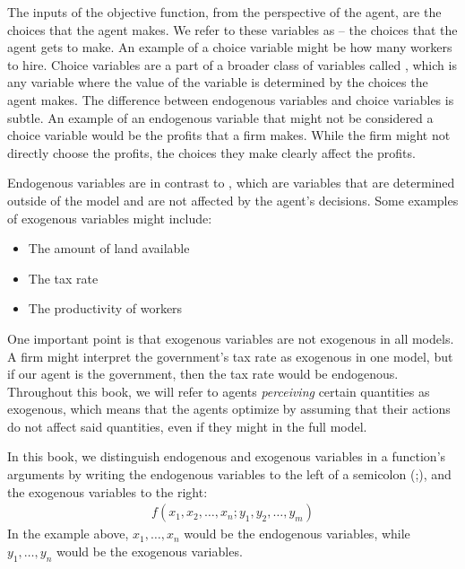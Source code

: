The inputs of the objective function, from the perspective of the agent, are the choices that the agent makes. We refer to these variables as  -- the choices that the agent gets to make. An example of a choice variable might be how many workers to hire. Choice variables are a part of a broader class of variables called , which is any variable where the value of the variable is determined by the choices the agent makes. The difference between endogenous variables and choice variables is subtle. An example of an endogenous variable that might not be considered a choice variable would be the profits that a firm makes. While the firm might not directly choose the profits, the choices they make clearly affect the profits.

Endogenous variables are in contrast to , which are variables that are determined outside of the model and are not affected by the agent's decisions. Some examples of exogenous variables might include:
\begin{itemize}
    \item The amount of land available
    \item The tax rate
    \item The productivity of workers
\end{itemize}
One important point is that exogenous variables are not exogenous in all models. A firm might interpret the government's tax rate as exogenous in one model, but if our agent is the government, then the tax rate would be endogenous. Throughout this book, we will refer to agents \textit{perceiving} certain quantities as exogenous, which means that the agents optimize by assuming that their actions do not affect said quantities, even if they might in the full model. 

In this book, we distinguish endogenous and exogenous variables in a function's arguments by writing the endogenous variables to the left of a semicolon (;), and the exogenous variables to the right:
\begin{align*}
    f(x_1, x_2, \dots, x_n ; y_1, y_2, \dots, y_m)
\end{align*}
In the example above, $x_1, \dots, x_n$ would be the endogenous variables, while $y_1, \dots, y_n$ would be the exogenous variables. 

